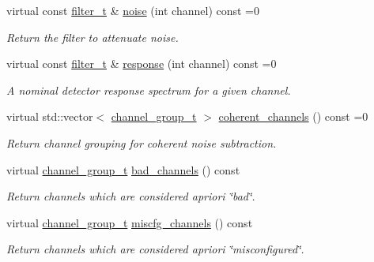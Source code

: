 \begin{DoxyCompactItemize}
virtual const \hyperlink{class_wire_cell_1_1_i_channel_noise_database_a0acbae29743542eb1c652f7a56e692f5}{filter\+\_\+t} \& \hyperlink{class_wire_cell_1_1_i_channel_noise_database_a1197551d9dcfd6dc8f656a8aecd5b962}{noise} (int channel) const =0
\begin{DoxyCompactList}\small\item\em Return the filter to attenuate noise. \end{DoxyCompactList}\item 
virtual const \hyperlink{class_wire_cell_1_1_i_channel_noise_database_a0acbae29743542eb1c652f7a56e692f5}{filter\+\_\+t} \& \hyperlink{class_wire_cell_1_1_i_channel_noise_database_ad3c42f59a26e8a8e115199a894d881da}{response} (int channel) const =0
\begin{DoxyCompactList}\small\item\em A nominal detector response spectrum for a given channel. \end{DoxyCompactList}\item 
virtual std\+::vector$<$ \hyperlink{class_wire_cell_1_1_i_channel_noise_database_a7fedd6ab67ba4e7eeb8cf182cc9dc6b1}{channel\+\_\+group\+\_\+t} $>$ \hyperlink{class_wire_cell_1_1_i_channel_noise_database_a0f220478d9d7ed3c913b925e84b39138}{coherent\+\_\+channels} () const =0
\begin{DoxyCompactList}\small\item\em Return channel grouping for coherent noise subtraction. \end{DoxyCompactList}\item 
virtual \hyperlink{class_wire_cell_1_1_i_channel_noise_database_a7fedd6ab67ba4e7eeb8cf182cc9dc6b1}{channel\+\_\+group\+\_\+t} \hyperlink{class_wire_cell_1_1_i_channel_noise_database_a70f4c0a24525f6a7c8ef84245fd6d01e}{bad\+\_\+channels} () const
\begin{DoxyCompactList}\small\item\em Return channels which are considered a\textquotesingle{}priori \char`\"{}bad\char`\"{}. \end{DoxyCompactList}\item 
virtual \hyperlink{class_wire_cell_1_1_i_channel_noise_database_a7fedd6ab67ba4e7eeb8cf182cc9dc6b1}{channel\+\_\+group\+\_\+t} \hyperlink{class_wire_cell_1_1_i_channel_noise_database_ad653c3c17b0524eca95fa4ce8574ffe9}{miscfg\+\_\+channels} () const
\begin{DoxyCompactList}\small\item\em Return channels which are considered a\textquotesingle{}priori \char`\"{}misconfigured\char`\"{}. \end{DoxyCompactList}\end{DoxyCompactItemize}


